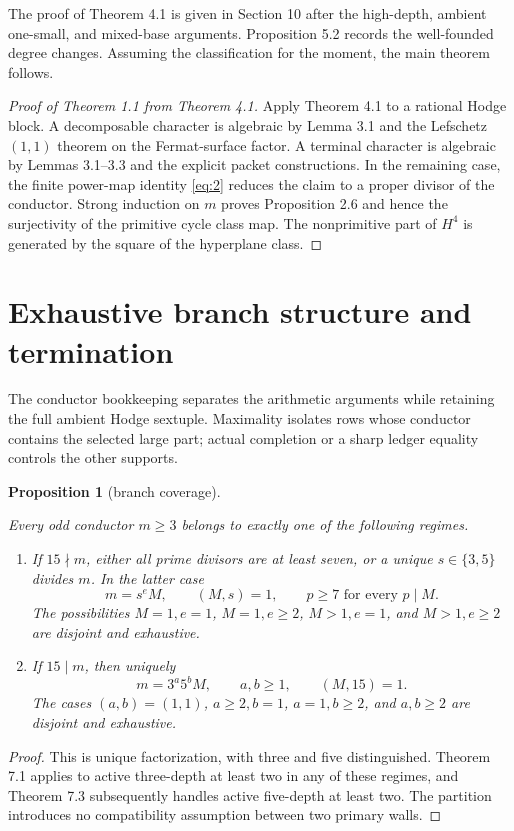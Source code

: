 \documentclass[11pt]{amsart}
\numberwithin{theorem}{section}
\newtheorem{proposition}[theorem]{Proposition}
\theoremstyle{remark}
\numberwithin{equation}{section}
\providecommand{\tightlist}{\setlength{\itemsep}{0pt}\setlength{\parskip}{0pt}}
\begin{document}
The proof of Theorem 4.1 is given in Section 10 after the high-depth,
ambient one-small, and mixed-base arguments. Proposition 5.2 records
the well-founded degree changes. Assuming the classification for the
moment, the main theorem follows.

\begin{proof}[Proof of Theorem 1.1 from Theorem 4.1]

Apply Theorem 4.1 to a rational Hodge block. A decomposable character is
algebraic by Lemma 3.1 and the Lefschetz \((1,1)\) theorem on the Fermat-surface
factor. A terminal character is algebraic by Lemmas 3.1--3.3 and the explicit
packet constructions. In the remaining case, the finite power-map identity \eqref{eq:2} reduces the claim to
a proper divisor of the conductor. Strong induction on \(m\) proves
Proposition 2.6 and hence the surjectivity of the primitive cycle class map.
The nonprimitive part of \(H^4\) is generated by the square of the hyperplane
class.
\end{proof}

\section{Exhaustive branch structure and termination}\label{sec:5}

The conductor bookkeeping separates the arithmetic arguments while
retaining the full ambient Hodge sextuple. Maximality isolates rows
whose conductor contains the selected large part; actual completion
or a sharp ledger equality controls the other supports.

\begin{proposition}[branch coverage]\label{proposition:5.1}

Every odd conductor \(m\ge3\) belongs to exactly one of the following
regimes.

\begin{enumerate}[label=\arabic*.,leftmargin=*]\tightlist
\item If \(15\nmid m\), either all prime divisors are at least seven,
or a unique \(s\in\{3,5\}\) divides \(m\). In the latter case
\[
m=s^eM,\qquad(M,s)=1,\qquad p\ge7\text{ for every }p\mid M.
\tag{5.1}\label{eq:5.1}
\]
The possibilities \(M=1,e=1\), \(M=1,e\ge2\),
\(M>1,e=1\), and \(M>1,e\ge2\) are disjoint and exhaustive.
\item If \(15\mid m\), then uniquely
\[
m=3^a5^bM,\qquad a,b\ge1,\qquad(M,15)=1.
\tag{5.2}\label{eq:5.2}
\]
The cases \((a,b)=(1,1)\), \(a\ge2,b=1\),
\(a=1,b\ge2\), and \(a,b\ge2\) are disjoint and exhaustive.
\end{enumerate}

\end{proposition}
\begin{proof}

This is unique factorization, with three and five distinguished.
Theorem 7.1 applies to active three-depth at least two in any of these
regimes, and Theorem 7.3 subsequently handles active five-depth at
least two. The partition introduces no compatibility assumption
between two primary walls.
\end{proof}
\end{document}
